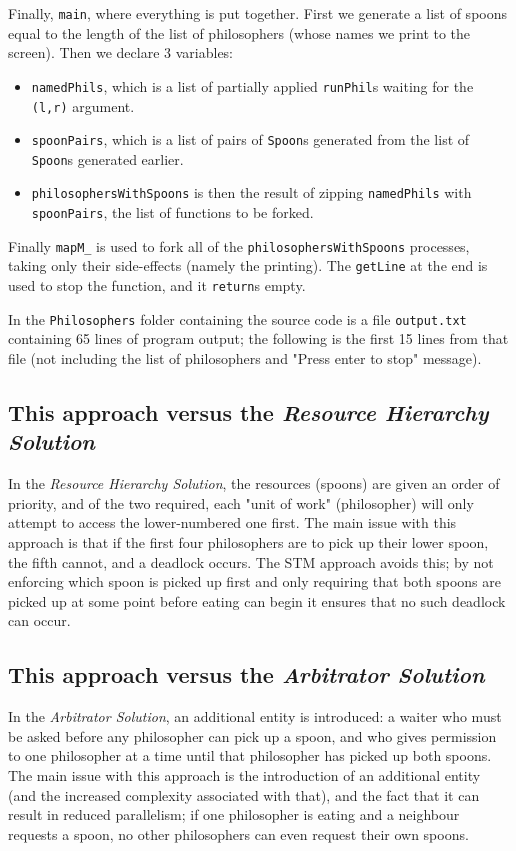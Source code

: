 \documentclass[12pt]{article}
\begin{document}
Finally, \verb|main|, where everything is put together.
First we generate a list of spoons equal to the length of the list of philosophers (whose names we print to the screen).
Then we declare 3 variables:
\begin{itemize}
  \item \verb|namedPhils|, which is a list of partially applied \verb|runPhil|s waiting for the \verb|(l,r)| argument.
  \item \verb|spoonPairs|, which is a list of pairs of \verb|Spoon|s generated from the list of \verb|Spoon|s generated earlier.
  \item \verb|philosophersWithSpoons| is then the result of zipping \verb|namedPhils| with \verb|spoonPairs|, the list of functions to be forked.
\end{itemize}

Finally \verb|mapM_| is used to fork all of the \verb|philosophersWithSpoons| processes, taking only their side-effects (namely the printing).
The \verb|getLine| at the end is used to stop the function, and it \verb|return|s empty.
\par
In the \verb|Philosophers| folder containing the source code is a file \verb|output.txt| containing 65 lines of program output; the following is the first 15 lines from that file (not including the list of philosophers and "Press enter to stop" message).



\subsection{This approach versus the \textit{Resource Hierarchy Solution}}
In the \textit{Resource Hierarchy Solution}, the resources (spoons) are given an order of priority, and  of the two required, each "unit of work" (philosopher) will only attempt to access the lower-numbered one first.
The main issue with this approach is that if the first four philosophers are to pick up their lower spoon, the fifth cannot, and a deadlock occurs.
The STM approach avoids this; by not enforcing which spoon is picked up first and only requiring that both spoons are picked up at some point before eating can begin it ensures that no such deadlock can occur.

\subsection{This approach versus the \textit{Arbitrator Solution}}
In the \textit{Arbitrator Solution}, an additional entity is introduced: a waiter who must be asked before any philosopher can pick up a spoon, and who gives permission to one philosopher at a time until that philosopher has picked up both spoons.
The main issue with this approach is the introduction of an additional entity (and the increased complexity associated with that), and the fact that it can result in reduced parallelism; if one philosopher is eating and a neighbour requests a spoon, no other philosophers can even request their own spoons.
\end{document}
